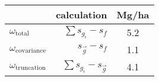 \begin{tabular}{lrc}
  \hline
 & calculation & Mg/ha \\ 
  \hline
$\omega_{\text{total}}$ & $\sum{s_{g_i}} - s_f$ & 5.2 \\ 
  $\omega_{\text{covariance}}$ & $s_{\vec{g}} - s_f$ & 1.1 \\ 
  $\omega_{\text{truncation}}$ & $\sum{s_{g_i}} - s_{\vec{g}}$ & 4.1 \\ 
   \hline
\end{tabular}
